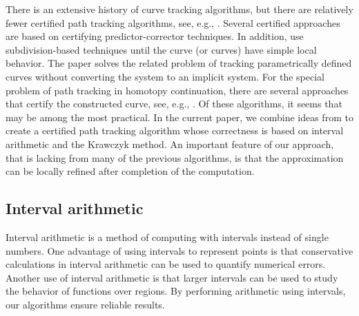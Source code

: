 There is an extensive history of curve tracking algorithms, but there are relatively fewer certified path tracking algorithms, see, e.g., \cite{kearfott1994interval,Kim:2004,PV:2004,PV:2007,BCGY:2012,martin2013certified,Hoeven2015,katsamaki2023ptopo,Byrd:2023}.  Several certified approaches \cite{kearfott1994interval,Kim:2004,martin2013certified,Hoeven2015} are based on certifying predictor-corrector techniques.  In addition, \cite{PV:2004,PV:2007,BCGY:2012,Byrd:2023} use subdivision-based techniques until the curve (or curves) have simple local behavior.  The paper \cite{katsamaki2023ptopo} solves the related problem of tracking parametrically defined curves without converting the system to an implicit system.  For the special problem of path tracking in homotopy continuation, there are several approaches that certify the constructed curve, see, e.g., \cite{Smale:1993,Beltran:2008,Burgisser:2011,beltran2012certified,beltran2013robust,hauenstein2014posteriori,Hauenstein:2016,xu2018approach,guillemot2024validated,duff2024certified}.  Of these algorithms, it seems that \cite{guillemot2024validated,duff2024certified} may be among the most practical.  In the current paper, we combine ideas from \cite{guillemot2024validated,duff2024certified} to create a certified path tracking algorithm whose correctness is based on interval arithmetic and the Krawczyk method.  An important feature of our approach, that is lacking from many of the previous algorithms, is that the approximation can be locally refined after completion of the computation.

\subsection{Interval arithmetic}
Interval arithmetic is a method of computing with intervals instead of single numbers.  One advantage of using intervals to represent points is that conservative calculations in interval arithmetic can be used to quantify numerical errors.  Another use of interval arithmetic is that larger intervals can be used to study the behavior of functions over regions.  By performing arithmetic using intervals, our algorithms ensure reliable results.  

